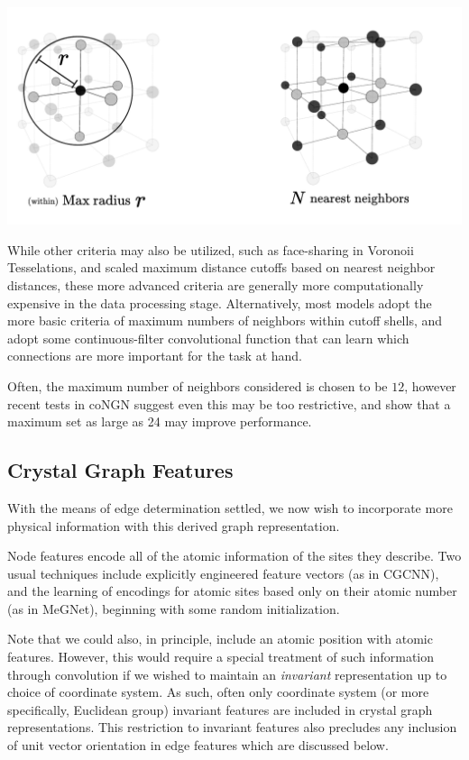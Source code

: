 \documentclass[10pt,a4paper]{article}
\begin{document}
\begin{center}
\includegraphics[scale=0.45]{ex_bondcriteria.pdf}
\end{center}
While other criteria may also be utilized, such as face-sharing in Voronoii Tesselations, and scaled maximum distance cutoffs based on nearest neighbor distances, these more advanced criteria are generally more computationally expensive in the data processing stage. Alternatively, most models \cite{cgcnn,alignn,megnet} adopt the more basic criteria of maximum numbers of neighbors within cutoff shells, and adopt some continuous-filter convolutional function that can learn which connections are more important for the task at hand.

Often, the maximum number of neighbors considered is chosen to be $12$, however recent tests in coNGN \cite{congn} suggest even this may be too restrictive, and show that a maximum set as large as 24 may improve performance.



\subsection{Crystal Graph Features}
With the means of edge determination settled, we now wish to incorporate more physical information with this derived graph representation. 


Node features encode all of the atomic information of the sites they describe. Two usual techniques include explicitly engineered feature vectors (as in CGCNN), and the learning of encodings for atomic sites based only on their atomic number (as in MeGNet), beginning with some random initialization.


Note that we could also, in principle, include an atomic position with atomic features. However, this would require a special treatment of such information through convolution if we wished to maintain an \textit{invariant} representation up to choice of coordinate system. As such, often only coordinate system (or more specifically, Euclidean group) invariant features are included in crystal graph representations. This restriction to invariant features also precludes any inclusion of unit vector orientation in edge features which are discussed below.
\end{document}
